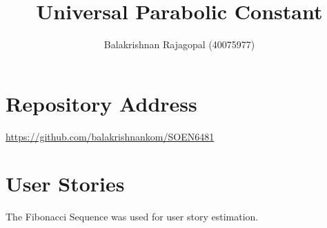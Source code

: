\documentclass[12pt]{report}
\title{Universal Parabolic Constant}
\author{Balakrishnan Rajagopal (40075977) }
\date{}
\date{}
\begin{document}
 

\maketitle 


\baselineskip20pt


\tableofcontents
\chapter{Repository Address}
\url{https://github.com/balakrishnankom/SOEN6481}


\chapter{User Stories}
    
 The Fibonacci Sequence was used for user story estimation.
\end{document}
